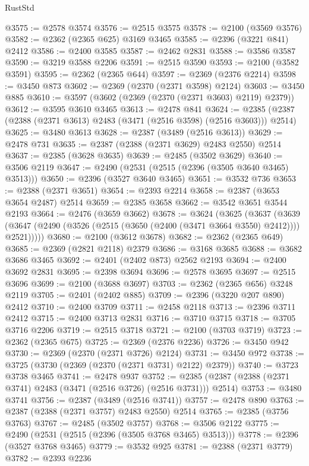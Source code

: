 \begin{lexlean}{RustStd}
\begin{coremodule}
{\begin{coremodule}
{{{{{{{{{{{{{{{{{{{{{{{{{{{{{{{{{{{{{{{{{{{{{{{{{{@3575 := @2578 @3574
@3576 := @2515 @3575
@3578 := @2100 (@3569 @3576)
@3582 := @2362 (@2365 @625) @3169 @3465
@3585 := @2396 (@3221 @841) @2412
@3586 := @2400 @3585
@3587 := @2462 @2831
@3588 := @3586 @3587
@3590 := @3219 @3588 @2206
@3591 := @2515 @3590
@3593 := @2100 (@3582 @3591)
@3595 := @2362 (@2365 @644)
@3597 := @2369 (@2376 @2214)
@3598 := @3450 @873
@3602 := @2369 (@2370 (@2371 @3598) @2124)
@3603 := @3450 @885
@3610 := @3597 (@3602 (@2369 (@2370 (@2371 @3603) @2119) @2379))
@3612 := @3595 @3610 @3465
@3613 := @2478 @841
@3624 := @2385 (@2387 (@2388 (@2371 @3613) @2483 (@3471 (@2516 @3598) (@2516 @3603))) @2514)
@3625 := @3480 @3613
@3628 := @2387 (@3489 (@2516 @3613))
@3629 := @2478 @731
@3635 := @2387 (@2388 (@2371 @3629) @2483 @2550) @2514
@3637 := @2385 (@3628 @3635)
@3639 := @2485 (@3502 @3629)
@3640 := @3506 @2119
@3647 := @2490 (@2531 (@2515 (@2396 (@3505 @3640 @3465) @3513)))
@3650 := @2396 (@3527 @3640 @3465)
@3651 := @3532 @736
@3653 := @2388 (@2371 @3651)
@3654 := @2393 @2214
@3658 := @2387 (@3653 @3654 @2487) @2514
@3659 := @2385 @3658
@3662 := @3542 @3651 @3544 @2193
@3664 := @2476 (@3659 @3662)
@3678 := @3624
    (@3625
      (@3637
        (@3639 (@3647 (@2490 (@3526 (@2515 (@3650 (@2400 (@3471 @3664 @3550) @2412)))) @2521)))))
@3680 := @2100 (@3612 @3678)
@3682 := @2362 (@2365 @649)
@3685 := @2369 (@2821 @2118) @2379
@3686 := @3168 @3685
@3688 := @3682 @3686 @3465
@3692 := @2401 (@2402 @873) @2562 @2193
@3694 := @2400 @3692 @2831
@3695 := @2398 @3694
@3696 := @2578 @3695
@3697 := @2515 @3696
@3699 := @2100 (@3688 @3697)
@3703 := @2362 (@2365 @656) @3248 @2119
@3705 := @2401 (@2402 @885)
@3709 := @2396 (@3220 @207 @890) @2412
@3710 := @2400 @3709
@3711 := @2458 @2118
@3713 := @2396 @3711 @2412
@3715 := @2400 @3713 @2831
@3716 := @3710 @3715
@3718 := @3705 @3716 @2206
@3719 := @2515 @3718
@3721 := @2100 (@3703 @3719)
@3723 := @2362 (@2365 @675)
@3725 := @2369 (@2376 @2236)
@3726 := @3450 @942
@3730 := @2369 (@2370 (@2371 @3726) @2124)
@3731 := @3450 @972
@3738 := @3725 (@3730 (@2369 (@2370 (@2371 @3731) @2122) @2379))
@3740 := @3723 @3738 @3465
@3741 := @2478 @937
@3752 := @2385 (@2387 (@2388 (@2371 @3741) @2483 (@3471 (@2516 @3726) (@2516 @3731))) @2514)
@3753 := @3480 @3741
@3756 := @2387 (@3489 (@2516 @3741))
@3757 := @2478 @890
@3763 := @2387 (@2388 (@2371 @3757) @2483 @2550) @2514
@3765 := @2385 (@3756 @3763)
@3767 := @2485 (@3502 @3757)
@3768 := @3506 @2122
@3775 := @2490 (@2531 (@2515 (@2396 (@3505 @3768 @3465) @3513)))
@3778 := @2396 (@3527 @3768 @3465)
@3779 := @3532 @925
@3781 := @2388 (@2371 @3779)
@3782 := @2393 @2236
}}}}}}}}}}}}}}}}}}}}}}}}}}}}}}}}}}}}}}}}}}}}}}}}}}
\end{coremodule}}
\end{coremodule}
\end{lexlean}
